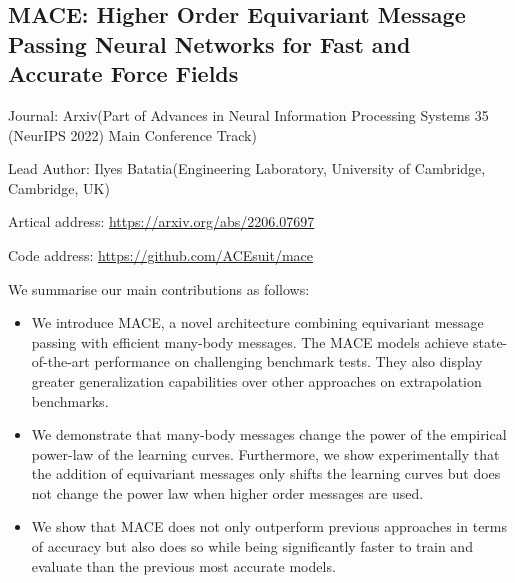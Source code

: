 \documentclass[11pt]{elegantbook}
\begin{document}
\subsection{MACE: Higher Order Equivariant Message Passing Neural Networks for Fast and Accurate Force Fields}
\begin{brief}
    \item Journal: Arxiv(Part of Advances in Neural Information Processing Systems 35 (NeurIPS 2022) Main Conference Track)
    \item Lead Author: Ilyes Batatia(Engineering Laboratory, University of Cambridge, Cambridge, UK)
    \item Artical address: \href{https://arxiv.org/abs/2206.07697}{https://arxiv.org/abs/2206.07697}
    \item Code address: \href{https://github.com/ACEsuit/mace}{https://github.com/ACEsuit/mace}
\end{brief}
We summarise our main contributions as follows:
\begin{itemize}
    \item We introduce MACE, a novel architecture combining equivariant message passing with efficient many-body messages. The MACE models achieve state-of-the-art performance on challenging benchmark tests. They also display greater generalization capabilities over other approaches on extrapolation benchmarks.
    \item We demonstrate that many-body messages change the power of the empirical power-law of the learning curves. Furthermore, we show experimentally that the addition of equivariant messages only shifts the learning curves but does not change the power law when higher order messages are used.
    \item We show that MACE does not only outperform previous approaches in terms of accuracy but also does so while being significantly faster to train and evaluate than the previous most accurate models.
\end{itemize}
\end{document}
